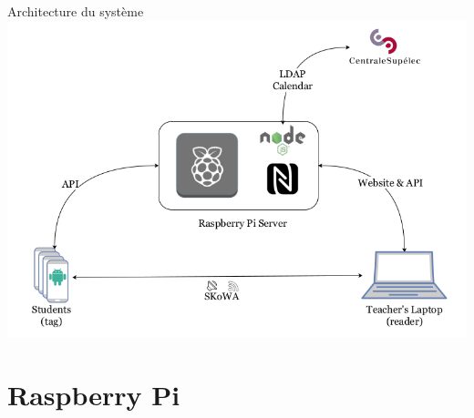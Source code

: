 \documentclass[aspectratio=169]{beamer}
\begin{document}
\begin{frame}{Architecture du système}
  \centering
  \includegraphics[height=0.8\textheight]{../assets/architecture.png}
\end{frame}


\section{Raspberry Pi}
\end{document}
